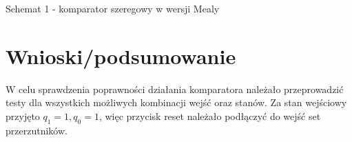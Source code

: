 \documentclass[12pt,a4paper]{article}
\begin{document}
		\vspace{1.5cm}
		\begin{center}
			Schemat 1 - komparator szeregowy w wersji Mealy
		\end{center}

	\section{Wnioski/podsumowanie}
	
			W celu sprawdzenia poprawności działania komparatora należało przeprowadzić testy dla wszystkich możliwych kombinacji wejść oraz stanów. Za stan wejściowy przyjęto \(q_1=1, q_0 = 1\), więc przycisk reset należało podłączyć do wejść set przerzutników.
	
\end{document}
